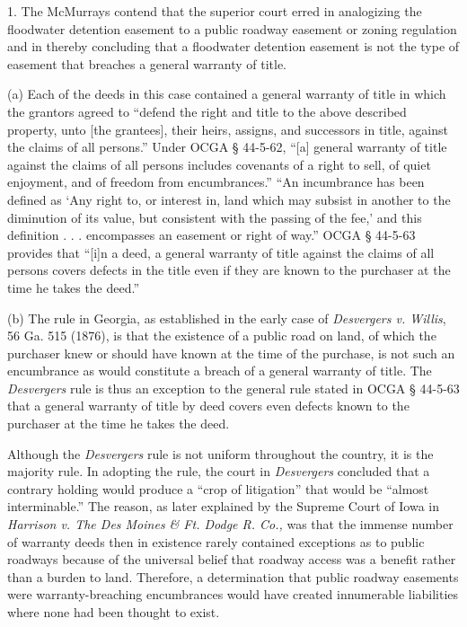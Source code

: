 1. The McMurrays contend that the superior court erred in analogizing the
floodwater detention easement to a public roadway easement or zoning regulation
and in thereby concluding that a floodwater detention easement is not the type
of easement that breaches a general warranty of title. 

(a) Each of the deeds in this case contained a general warranty of title in
which the grantors agreed to ``defend the right and title to the above
described property, unto [the grantees], their heirs, assigns, and successors
in title, against the claims of all persons.'' Under OCGA {\S} 44-5-62, ``[a]
general warranty of title against the claims of all persons includes covenants
of a right to sell, of quiet enjoyment, and of freedom from encumbrances.''
``An incumbrance has been defined as `Any right to, or interest in, land which
may subsist in another to the diminution of its value, but consistent with the
passing of the fee,' and this definition . . . encompasses an easement or right
of way.'' OCGA {\S} 44-5-63 provides that ``[i]n a deed, a general warranty of
title against the claims of all persons covers defects in the title even if
they are known to the purchaser at the time he takes the deed.'' 

(b) The rule in Georgia, as established in the early case of \textit{Desvergers
v. Willis}, 56 Ga. 515 (1876), is that the existence of a public road on land,
of which the purchaser knew or should have known at the time of the purchase,
is not such an encumbrance as would constitute a breach of a general warranty
of title. The \textit{Desvergers }rule is thus an exception to the general rule
stated in OCGA {\S} 44-5-63 that a general warranty of title by deed covers
even defects known to the purchaser at the time he takes the deed. 

Although the \textit{Desvergers }rule is not uniform throughout the country, it
is the majority rule. In adopting the rule, the court in \textit{Desvergers
}concluded that a contrary holding would produce a ``crop of litigation'' that
would be ``almost interminable.'' The reason, as later explained by the Supreme
Court of Iowa in \textit{Harrison v. The Des Moines \& Ft. Dodge R. Co., }was
that the immense number of warranty deeds then in existence rarely contained
exceptions as to public roadways because of the universal belief that roadway
access was a benefit rather than a burden to land. Therefore, a determination
that public roadway easements were warranty-breaching encumbrances would have
created innumerable liabilities where none had been thought to exist. 

